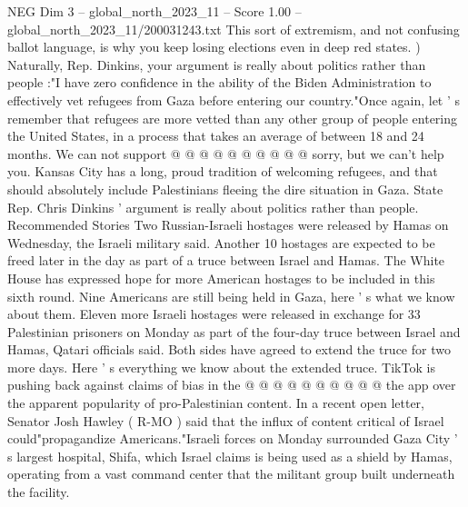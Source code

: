 \begin{textsample}{NEG Dim 3 – global\_north\_2023\_11 – Score 1.00 – global\_north\_2023\_11/200031243.txt}
This sort of extremism, and not confusing ballot language, is why you keep losing elections even in deep red states. ) Naturally, Rep.
Dinkins, your argument is really about politics rather than people :"I have zero confidence in the ability of the Biden Administration to effectively vet refugees from Gaza before entering our country."Once again, let ' s remember that refugees are more vetted than any other group of people entering the United States, in a process that takes an average of between 18 and 24 months.
We can not support @ @ @ @ @ @ @ @ @ @ sorry, but we can't help you.
Kansas City has a long, proud tradition of welcoming refugees, and that should absolutely include Palestinians fleeing the dire situation in Gaza.
State Rep.
Chris Dinkins ' argument is really about politics rather than people.
Recommended Stories Two Russian-Israeli hostages were released by Hamas on Wednesday, the Israeli military said.
Another 10 hostages are expected to be freed later in the day as part of a truce between Israel and Hamas.
The White House has expressed hope for more American hostages to be included in this sixth round.
Nine Americans are still being held in Gaza, here ' s what we know about them.
Eleven more Israeli hostages were released in exchange for 33 Palestinian prisoners on Monday as part of the four-day truce between Israel and Hamas, Qatari officials said.
Both sides have agreed to extend the truce for two more days.
Here ' s everything we know about the extended truce.
TikTok is pushing back against claims of bias in the @ @ @ @ @ @ @ @ @ @ the app over the apparent popularity of pro-Palestinian content.
In a recent open letter, Senator Josh Hawley ( R-MO ) said that the influx of content critical of Israel could"propagandize Americans."Israeli forces on Monday surrounded Gaza City ' s largest hospital, Shifa, which Israel claims is being used as a shield by Hamas, operating from a vast command center that the militant group built underneath the facility.

\end{textsample}
